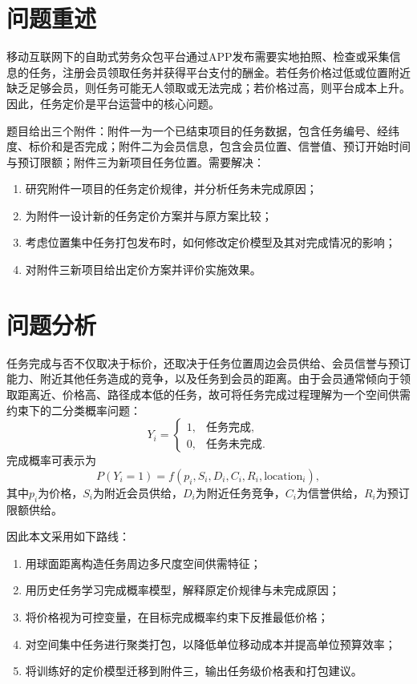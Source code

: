 \documentclass[UTF8,a4paper,12pt]{ctexart}
\begin{document}
\section{问题重述}
移动互联网下的自助式劳务众包平台通过APP发布需要实地拍照、检查或采集信息的任务，注册会员领取任务并获得平台支付的酬金。若任务价格过低或位置附近缺乏足够会员，则任务可能无人领取或无法完成；若价格过高，则平台成本上升。因此，任务定价是平台运营中的核心问题。

题目给出三个附件：附件一为一个已结束项目的任务数据，包含任务编号、经纬度、标价和是否完成；附件二为会员信息，包含会员位置、信誉值、预订开始时间与预订限额；附件三为新项目任务位置。需要解决：
\begin{enumerate}[label=\arabic*)]
  \item 研究附件一项目的任务定价规律，并分析任务未完成原因；
  \item 为附件一设计新的任务定价方案并与原方案比较；
  \item 考虑位置集中任务打包发布时，如何修改定价模型及其对完成情况的影响；
  \item 对附件三新项目给出定价方案并评价实施效果。
\end{enumerate}

\section{问题分析}
任务完成与否不仅取决于标价，还取决于任务位置周边会员供给、会员信誉与预订能力、附近其他任务造成的竞争，以及任务到会员的距离。由于会员通常倾向于领取距离近、价格高、路径成本低的任务，故可将任务完成过程理解为一个空间供需约束下的二分类概率问题：
\[
Y_i=\begin{cases}1,&\text{任务完成},\\0,&\text{任务未完成}.\end{cases}
\]
完成概率可表示为
\[
P(Y_i=1)=f(p_i,S_i,D_i,C_i,R_i,\text{location}_i),
\]
其中$p_i$为价格，$S_i$为附近会员供给，$D_i$为附近任务竞争，$C_i$为信誉供给，$R_i$为预订限额供给。

因此本文采用如下路线：
\begin{enumerate}[label=\arabic*)]
\item 用球面距离构造任务周边多尺度空间供需特征；
\item 用历史任务学习完成概率模型，解释原定价规律与未完成原因；
\item 将价格视为可控变量，在目标完成概率约束下反推最低价格；
\item 对空间集中任务进行聚类打包，以降低单位移动成本并提高单位预算效率；
\item 将训练好的定价模型迁移到附件三，输出任务级价格表和打包建议。
\end{enumerate}
\end{document}
